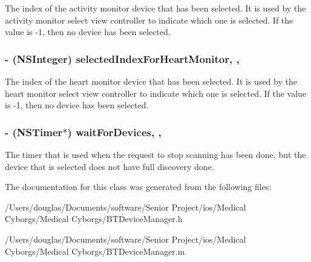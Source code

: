 The index of the activity monitor device that has been selected. It is used by the activity monitor select view controller to indicate which one is selected. If the value is -\/1, then no device has been selected. \hypertarget{interface_b_t_device_manager_a98add70110c91e4266481e312d96afbf}{
\subsubsection[{selected\-Index\-For\-Heart\-Monitor}]{\setlength{\rightskip}{0pt plus 5cm}-\/ (N\-S\-Integer) selected\-Index\-For\-Heart\-Monitor\hspace{0.3cm}{\ttfamily [read]}, {\ttfamily [write]}, {\ttfamily [atomic]}}}\label{interface_b_t_device_manager_a98add70110c91e4266481e312d96afbf}
The index of the heart monitor device that has been selected. It is used by the heart monitor select view controller to indicate which one is selected. If the value is -\/1, then no device has been selected. \hypertarget{interface_b_t_device_manager_aad4f780b6477ad7d37f6e85f3f40f1c0}{
\subsubsection[{wait\-For\-Devices}]{\setlength{\rightskip}{0pt plus 5cm}-\/ (N\-S\-Timer$\ast$) wait\-For\-Devices\hspace{0.3cm}{\ttfamily [read]}, {\ttfamily [write]}, {\ttfamily [atomic]}}}\label{interface_b_t_device_manager_aad4f780b6477ad7d37f6e85f3f40f1c0}
The timer that is used when the request to stop scanning has been done, but the device that is selected does not have full discovery done. 

The documentation for this class was generated from the following files\-:\begin{DoxyCompactItemize}
\item 
/\-Users/douglas/\-Documents/software/\-Senior Project/ios/\-Medical Cyborgs/\-Medical Cyborgs/B\-T\-Device\-Manager.\-h\item 
/\-Users/douglas/\-Documents/software/\-Senior Project/ios/\-Medical Cyborgs/\-Medical Cyborgs/B\-T\-Device\-Manager.\-m\end{DoxyCompactItemize}
